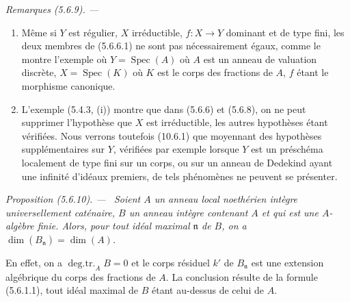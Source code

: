 \documentclass[10pt,oneside]{book}
\newenvironment{proposition}[1][]{%
  \par\medskip\noindent\itshape Proposition (#1). ---\ }{\par}
\newenvironment{remarks}[1][]{%
  \par\medskip\noindent\itshape Remarques (#1). ---\ }{\par}
\begin{document}
\begin{remarks}[5.6.9]
\label{IV.2.s5.6.9-fr}
\begin{enumerate}
\item[(i)] Même si $Y$ est régulier, $X$ irréductible, $f:X\to Y$ dominant
et de type fini, les deux membres de (5.6.6.1) ne sont pas nécessairement
égaux, comme le montre l'exemple où $Y=\operatorname{Spec}(A)$ où $A$ est un
anneau de valuation discrète, $X=\operatorname{Spec}(K)$ où $K$ est le corps
des fractions de $A$, $f$ étant le morphisme canonique.
\item[(ii)] L'exemple (5.4.3, (i)) montre que dans (5.6.6) et (5.6.8), on ne
peut supprimer l'hypothèse que $X$ est irréductible, les autres hypothèses
étant vérifiées. Nous verrons toutefois (10.6.1) que moyennant des hypothèses
supplémentaires sur $Y$, vérifiées par exemple lorsque $Y$ est un préschéma
localement de type fini sur un corps, ou sur un anneau de Dedekind ayant une
infinité d'idéaux premiers, de tels phénomènes ne peuvent se présenter.
\end{enumerate}
\end{remarks}

\begin{proposition}[5.6.10]
\label{IV.2.s5.6.10-fr}
Soient $A$ un anneau local noethérien intègre universellement caténaire, $B$
un anneau intègre contenant $A$ et qui est une $A$-algèbre finie. Alors, pour
tout idéal maximal $\mathfrak n$ de $B$, on a
$\dim(B_{\mathfrak n})=\dim(A)$.
\end{proposition}

En effet, on a $\operatorname{deg.tr.}_A B=0$ et le corps résiduel $k'$ de
$B_{\mathfrak n}$ est une extension algébrique du corps des fractions de
$A$. La conclusion résulte de la formule (5.6.1.1), tout idéal maximal de
$B$ étant au-dessus de celui de $A$.
\end{document}
